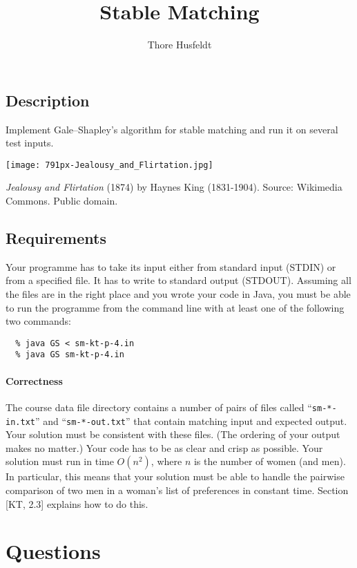 \documentclass{tufte-handout}
\title{Stable Matching}
\author{Thore Husfeldt}
\begin{document}
\maketitle

\subsection{Description}
Implement Gale–Shapley’s algorithm for stable matching and run it on several test inputs.

\begin{marginfigure}
\texttt{[image: 791px-Jealousy\_and\_Flirtation.jpg]}
\caption{\emph{Jealousy and Flirtation} (1874) by Haynes King (1831-1904).
Source: Wikimedia Commons. Public domain.}
\end{marginfigure}

\subsection{Requirements}
Your programme has to take its input either from standard input (STDIN) or from a specified file.
It has to write to standard output (STDOUT).
Assuming all the files are in the right place and you wrote your code in Java, you must be able to run the programme from the command line with at least one of the following two commands:
\begin{verbatim}
  % java GS < sm-kt-p-4.in
  % java GS sm-kt-p-4.in
\end{verbatim}

\paragraph{Correctness}
The course data file directory contains a number of pairs of files called “{\tt sm-*-in.txt}” and “{\tt sm-*-out.txt}” that contain matching input and expected output.
Your solution must be consistent with these files.
(The ordering of your output makes no matter.)
Your code has to be as clear and crisp as possible.
Your solution must run in time $O(n^2)$, where $n$ is the number of women (and men).
In particular, this means that your solution must be able to handle the pairwise comparison of two men in a woman’s list of preferences in constant time.
Section [KT, 2.3] explains how to do this.

\section{Questions}
\end{document}
